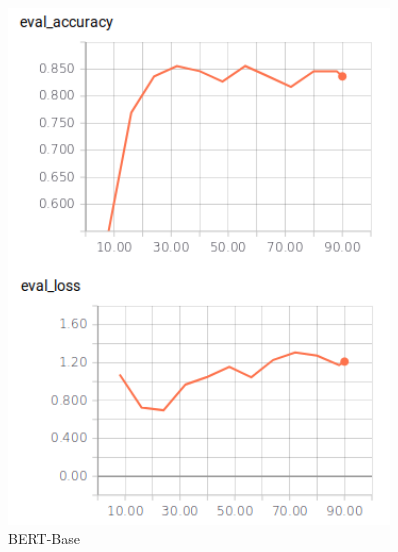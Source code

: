 \begin{figure}
    \centering
    \begin{minipage}{0.30\textwidth}
        \includegraphics[width=0.9\textwidth]{figures/tensorboard_askubuntu.png}
        \caption{BERT-Base}
        \label{fig:tensorboard_base}
    \end{minipage}
    \hspace*{3mm}
    \begin{minipage}{0.30\textwidth}

\end{minipage}
\end{figure}
